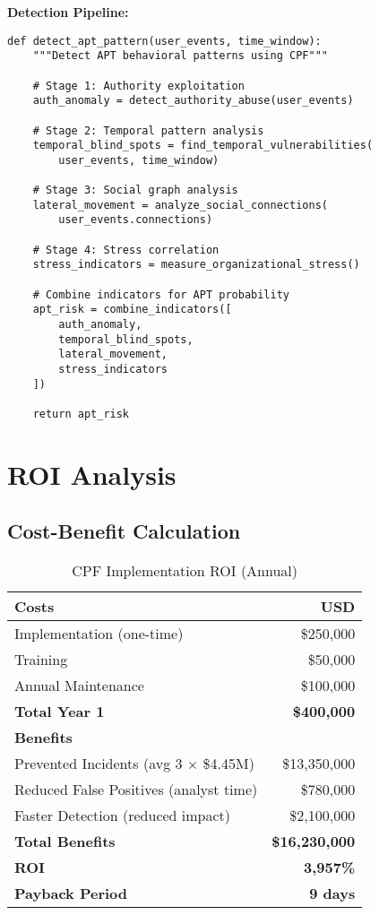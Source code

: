 \documentclass[11pt,a4paper]{article}
\begin{document}
\textbf{Detection Pipeline:}
\begin{lstlisting}
def detect_apt_pattern(user_events, time_window):
    """Detect APT behavioral patterns using CPF"""
    
    # Stage 1: Authority exploitation
    auth_anomaly = detect_authority_abuse(user_events)
    
    # Stage 2: Temporal pattern analysis
    temporal_blind_spots = find_temporal_vulnerabilities(
        user_events, time_window)
    
    # Stage 3: Social graph analysis
    lateral_movement = analyze_social_connections(
        user_events.connections)
    
    # Stage 4: Stress correlation
    stress_indicators = measure_organizational_stress()
    
    # Combine indicators for APT probability
    apt_risk = combine_indicators([
        auth_anomaly,
        temporal_blind_spots,
        lateral_movement,
        stress_indicators
    ])
    
    return apt_risk
\end{lstlisting}

\section{ROI Analysis}

\subsection{Cost-Benefit Calculation}

\begin{table}[H]
\centering
\caption{CPF Implementation ROI (Annual)}
\begin{tabular}{lr}
\toprule
\textbf{Costs} & \textbf{USD} \\
\midrule
Implementation (one-time) & \$250,000 \\
Training & \$50,000 \\
Annual Maintenance & \$100,000 \\
\textbf{Total Year 1} & \textbf{\$400,000} \\
\midrule
\textbf{Benefits} & \\
\midrule
Prevented Incidents (avg 3 × \$4.45M) & \$13,350,000 \\
Reduced False Positives (analyst time) & \$780,000 \\
Faster Detection (reduced impact) & \$2,100,000 \\
\textbf{Total Benefits} & \textbf{\$16,230,000} \\
\midrule
\textbf{ROI} & \textbf{3,957\%} \\
\textbf{Payback Period} & \textbf{9 days} \\
\bottomrule
\end{tabular}
\end{table}
\end{document}
